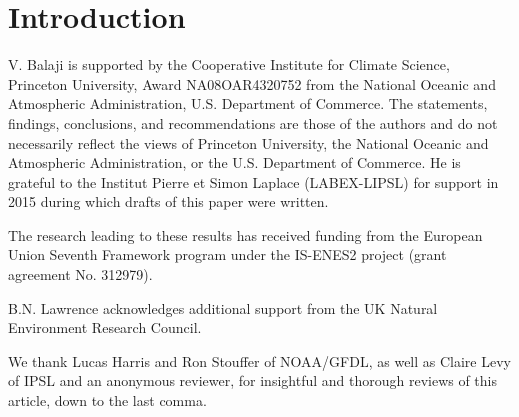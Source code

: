 \documentclass[gmd,manuscript]{copernicus}
\begin{document}
\abstract{
}

\section{Introduction}
\label{sec:intro}


\begin{acknowledgements}
  V. Balaji is supported by the Cooperative Institute for Climate
  Science, Princeton University, Award NA08OAR4320752 from the
  National Oceanic and Atmospheric Administration, U.S. Department of
  Commerce. The statements, findings, conclusions, and recommendations
  are those of the authors and do not necessarily reflect the views of
  Princeton University, the National Oceanic and Atmospheric
  Administration, or the U.S. Department of Commerce. He is grateful
  to the Institut Pierre et Simon Laplace (LABEX-LIPSL) for support in
  2015 during which drafts of this paper were written.

  The research leading to these results has received funding from the
  European Union Seventh Framework program under the IS-ENES2 project
  (grant agreement No. 312979).

  B.N. Lawrence acknowledges additional support from the UK Natural
  Environment Research Council.

  We thank Lucas Harris and Ron Stouffer of NOAA/GFDL, as well as
  Claire Levy of IPSL and an anonymous reviewer, for insightful and
  thorough reviews of this article, down to the last comma.
\end{acknowledgements}



\end{document}
